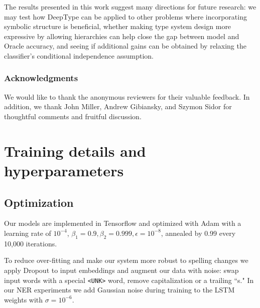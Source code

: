 \documentclass[letterpaper]{article}
\begin{document}
The results presented in this work suggest many directions for future research: we may test how DeepType can be applied to other problems where incorporating symbolic structure is beneficial, whether making type system design more expressive by allowing hierarchies can help close the gap between model and Oracle accuracy, and seeing if additional gains can be obtained by relaxing the classifier's conditional independence assumption.
\subsubsection*{Acknowledgments}
We would like to thank the anonymous reviewers for their valuable feedback. In addition, we thank John Miller, Andrew Gibiansky, and Szymon Sidor for thoughtful comments and fruitful discussion.
\normalsize
\appendix
\appendixpage
\section{Training details and hyperparameters}
\label{section:hyperparameters}
\subsection{Optimization}

Our models are implemented in Tensorflow and optimized with Adam with a learning rate of $10^{-4}$, $\beta_1=0.9, \beta_2=0.999, \epsilon=10^{-8}$, annealed by 0.99 every 10,000 iterations. 

To reduce over-fitting and make our system more robust to spelling changes we apply Dropout to input embeddings and augment our data with noise: swap input words with a special \texttt{<UNK>} word, remove capitalization or a trailing ``s." In our NER experiments we add Gaussian noise during training to the LSTM weights with $\sigma=10^{-6}$.
\end{document}
